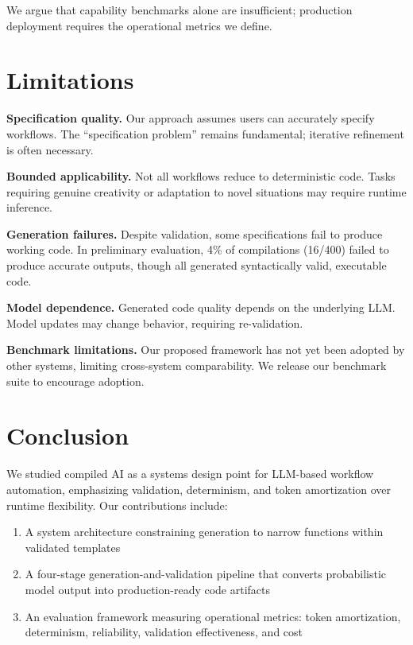 \documentclass[11pt]{article}
\begin{document}
We argue that capability benchmarks alone are insufficient; production deployment requires the operational metrics we define.

\section{Limitations}
\label{sec:limitations}

\textbf{Specification quality.} Our approach assumes users can accurately specify workflows. The ``specification problem'' remains fundamental; iterative refinement is often necessary.

\textbf{Bounded applicability.} Not all workflows reduce to deterministic code. Tasks requiring genuine creativity or adaptation to novel situations may require runtime inference.

\textbf{Generation failures.} Despite validation, some specifications fail to produce working code. In preliminary evaluation, 4\% of compilations (16/400) failed to produce accurate outputs, though all generated syntactically valid, executable code.

\textbf{Model dependence.} Generated code quality depends on the underlying LLM. Model updates may change behavior, requiring re-validation.

\textbf{Benchmark limitations.} Our proposed framework has not yet been adopted by other systems, limiting cross-system comparability. We release our benchmark suite to encourage adoption.

\section{Conclusion}
\label{sec:conclusion}

We studied compiled AI as a systems design point for LLM-based workflow automation, emphasizing validation, determinism, and token amortization over runtime flexibility. Our contributions include:

\begin{enumerate}
    \item A system architecture constraining generation to narrow functions within validated templates
    \item A four-stage generation-and-validation pipeline that converts probabilistic model output into production-ready code artifacts
    \item An evaluation framework measuring operational metrics: token amortization, determinism, reliability, validation effectiveness, and cost
\end{enumerate}
\end{document}
